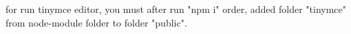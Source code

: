 for run tinymce editor, you must after run "npm i" order,
added folder "tinymce" from node-module folder to folder "public".